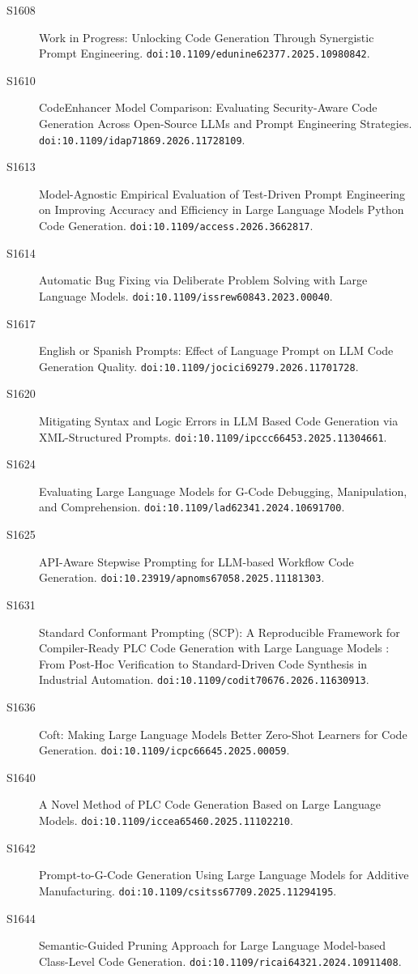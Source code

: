{\begin{description}
\item[S1608] Work in Progress: Unlocking Code Generation Through Synergistic Prompt Engineering. \texttt{doi:10.1109/edunine62377.2025.10980842}.
\item[S1610] CodeEnhancer Model Comparison: Evaluating Security-Aware Code Generation Across Open-Source LLMs and Prompt Engineering Strategies. \texttt{doi:10.1109/idap71869.2026.11728109}.
\item[S1613] Model-Agnostic Empirical Evaluation of Test-Driven Prompt Engineering on Improving Accuracy and Efficiency in Large Language Models Python Code Generation. \texttt{doi:10.1109/access.2026.3662817}.
\item[S1614] Automatic Bug Fixing via Deliberate Problem Solving with Large Language Models. \texttt{doi:10.1109/issrew60843.2023.00040}.
\item[S1617] English or Spanish Prompts: Effect of Language Prompt on LLM Code Generation Quality. \texttt{doi:10.1109/jocici69279.2026.11701728}.
\item[S1620] Mitigating Syntax and Logic Errors in LLM Based Code Generation via XML-Structured Prompts. \texttt{doi:10.1109/ipccc66453.2025.11304661}.
\item[S1624] Evaluating Large Language Models for G-Code Debugging, Manipulation, and Comprehension. \texttt{doi:10.1109/lad62341.2024.10691700}.
\item[S1625] API-Aware Stepwise Prompting for LLM-based Workflow Code Generation. \texttt{doi:10.23919/apnoms67058.2025.11181303}.
\item[S1631] Standard Conformant Prompting (SCP): A Reproducible Framework for Compiler-Ready PLC Code Generation with Large Language Models : From Post-Hoc Verification to Standard-Driven Code Synthesis in Industrial Automation. \texttt{doi:10.1109/codit70676.2026.11630913}.
\item[S1636] Coft: Making Large Language Models Better Zero-Shot Learners for Code Generation. \texttt{doi:10.1109/icpc66645.2025.00059}.
\item[S1640] A Novel Method of PLC Code Generation Based on Large Language Models. \texttt{doi:10.1109/iccea65460.2025.11102210}.
\item[S1642] Prompt-to-G-Code Generation Using Large Language Models for Additive Manufacturing. \texttt{doi:10.1109/csitss67709.2025.11294195}.
\item[S1644] Semantic-Guided Pruning Approach for Large Language Model-based Class-Level Code Generation. \texttt{doi:10.1109/ricai64321.2024.10911408}.

\end{description}}
